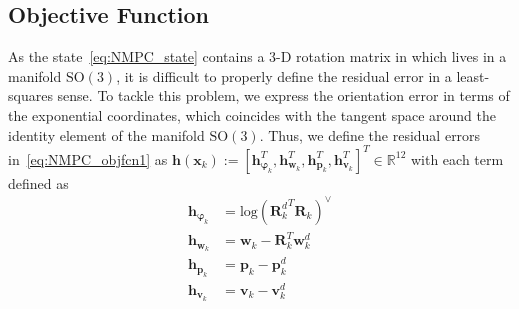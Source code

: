 \subsection{Objective Function} \label{Objective_Function}
As the state~\eqref{eq:NMPC_state} contains a 3-D rotation matrix in which lives in a manifold $\mathrm{SO}(3)$, it is difficult to properly define the residual error in a least-squares sense. 
To tackle this problem, we express the orientation error in terms of the exponential coordinates, which coincides with the tangent space around the identity element of the manifold $\mathrm{SO}(3)$.
Thus, we define the residual errors in~\eqref{eq:NMPC_objfcn1} as $\mathbf{h}(\mathbf{x}_{k}):= 
[\mathbf{h}_{\boldsymbol{\varphi}_{k}}^{T}, 
\mathbf{h}_{\mathbf{w}_{k}}^{T},
\mathbf{h}_{\mathbf{p}_{k}}^{T},
\mathbf{h}_{\mathbf{v}_{k}}^{T}]^{T} \in \mathbb{R}^{12}$ with each term defined as 
\begin{subequations} \label{eq:NMPC_residual}
	\begin{align}
	\label{eq:NMPC_residual_R}
	\mathbf{h}_{\boldsymbol{\varphi}_{k}} &= \mathrm{log}({\mathbf{R}^{d}_{k}}^{T} \mathbf{R}_{k})^{\vee} \\
	\label{eq:NMPC_residual_w}
	\mathbf{h}_{\mathbf{w}_{k}} &= \mathbf{w}_{k} - \mathbf{R}_{k}^{T} \mathbf{w}_{k}^{d} \\
	\label{eq:NMPC_residual_p}
	\mathbf{h}_{\mathbf{p}_{k}} &= \mathbf{p}_{k} - \mathbf{p}_{k}^{d} \\
	\label{eq:NMPC_residual_v}
	\mathbf{h}_{\mathbf{v}_{k}} &= \mathbf{v}_{k} - \mathbf{v}_{k}^{d}
	\end{align}
\end{subequations}
